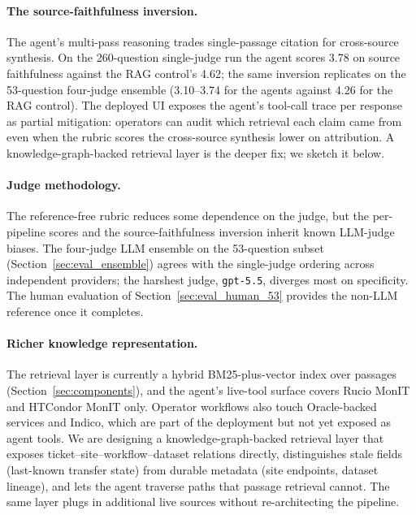 \paragraph{The source-faithfulness inversion.}
The agent's multi-pass reasoning trades single-passage citation
for cross-source synthesis. On the 260-question single-judge run
the agent scores 3.78 on source faithfulness against the RAG
control's 4.62; the same inversion replicates on the
53-question four-judge ensemble (3.10--3.74 for the agents
against 4.26 for the RAG control). The deployed UI exposes the
agent's tool-call trace per response as partial mitigation:
operators can audit which retrieval each claim came from even
when the rubric scores the cross-source synthesis lower on
attribution. A knowledge-graph-backed retrieval layer is the
deeper fix; we sketch it below.

\paragraph{Judge methodology.}
The reference-free rubric reduces some dependence on the judge,
but the per-pipeline scores and the source-faithfulness inversion
inherit known LLM-judge biases. The four-judge LLM ensemble on
the 53-question subset (Section~\ref{sec:eval_ensemble}) agrees
with the single-judge ordering across independent providers; the
harshest judge, \texttt{gpt-5.5}, diverges most on specificity.
The human evaluation of Section~\ref{sec:eval_human_53} provides
the non-LLM reference once it completes.

\paragraph{Richer knowledge representation.}
The retrieval layer is currently a hybrid BM25-plus-vector index
over passages (Section~\ref{sec:components}), and the agent's
live-tool surface covers Rucio MonIT and HTCondor MonIT only.
Operator workflows also touch Oracle-backed services and Indico,
which are part of the deployment but not yet exposed as agent
tools. We are designing a knowledge-graph-backed retrieval layer
that exposes ticket--site--workflow--dataset relations directly,
distinguishes stale fields (last-known transfer state) from
durable metadata (site endpoints, dataset lineage), and lets
the agent traverse paths that passage retrieval cannot. The same
layer plugs in additional live sources without re-architecting
the pipeline.
